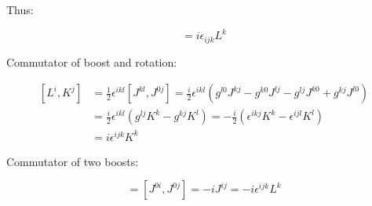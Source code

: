 \documentclass[11pt]{article}
\begin{document}
Thus:

\begin{equation}
[ L^i, L^j ] = i \epsilon_{ijk} L^k
\end{equation}

\pagebreak

Commutator of boost and rotation:

\begin{equation}
\begin{split}
[ L^i, K^j ] & = \frac{1}{2} \epsilon^{ikl} [ J^{kl}, J^{0j} ] =
  \frac{i}{2} \epsilon^{ikl} \left(
    g^{l0} J^{kj} - g^{k0} J^{lj} - g^{lj} J^{k0} + g^{kj} J^{l0}
  \right) \\
& = \frac{i}{2} \epsilon^{ikl}
  \left( g^{lj} K^k - g^{kj} K^l \right) =
  -\frac{i}{2}
  \left( \epsilon^{ikj} K^k - \epsilon^{ijl} K^l \right) \\
& = i \epsilon^{ijk} K^k
\end{split}
\end{equation}

Commutator of two boosts:

\begin{equation}
[ K^i, K^j ] = [ J^{0i}, J^{0j} ] =
-i J^{ij} = - i \epsilon^{ijk} L^k
\end{equation}
\end{document}
